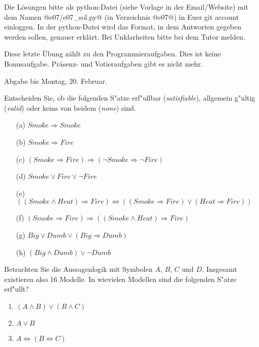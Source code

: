

\renewcommand{\course}{Artificial Intelligence}
\renewcommand{\coursepicture}{course_ai}
\renewcommand{\coursedate}{Winter 2019}
\renewcommand{\exnum}{7}

\exercises
{}
\exercisestitle

Die Lösungen bitte als python-Datei (siehe Vorlage in der
Email/Website) mit dem Namen @e07/e07_sol.py@ (in Verzeichnis @e07@)
in Euer git account einloggen. In der python-Datei wird das Format, in
dem Antworten gegeben werden sollen, genauer erklärt. Bei Unklarheiten
bitte bei dem Tutor melden.

Diese letzte Übung zählt zu den Programmieraufgaben. Dies ist keine
Bonusaufgabe. Präsenz- und Votieraufgaben gibt es nicht mehr.

Abgabe bis Montag, 20. Februar.


Entscheiden Sie, ob die folgenden S"atze erf"ullbar (\emph{satisfiable}),
allgemein g"ultig (\emph{valid}) oder keins von beidem (\emph{none})
sind. 

\begin{enumerate}
\item[(a)] $Smoke \Rightarrow Smoke$
\item[(b)] $Smoke \Rightarrow Fire$
\item[(c)] $(Smoke \Rightarrow Fire) \Rightarrow (\neg Smoke \Rightarrow \neg Fire)$
\item[(d)] $Smoke \vee Fire \vee \neg Fire$
\item[(e)] $((Smoke \wedge Heat) \Rightarrow Fire) \Leftrightarrow ((Smoke \Rightarrow Fire) \vee (Heat \Rightarrow Fire))$
\item[(f)] $(Smoke \Rightarrow Fire) \Rightarrow ((Smoke \wedge Heat) \Rightarrow Fire)$
\item[(g)] $Big \vee Dumb \vee (Big \Rightarrow Dumb)$
\item[(h)] $(Big \wedge Dumb) \vee \neg Dumb$
\end{enumerate}



Betrachten Sie die Aussagenlogik mit Symbolen $A$, $B$, $C$ und
$D$. Insgesamt existieren also 16 Modelle. In wievielen Modellen sind die folgenden S"atze erf"ullt?
\begin{enumerate}
\item $(A \wedge B) \vee (B \wedge  C)$
\item $A \vee B$
\item $A \Leftrightarrow (B \Leftrightarrow C)$
\end{enumerate}

